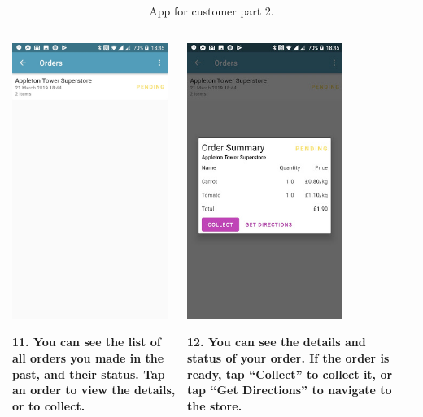 \documentclass[onecolumn]{IEEEtran}
\begin{document}
\begin{table}[H]
\begin{tabular}{ | m{5.5cm} | m{5.5cm} | m{5.5cm} | }
\begin{minipage}{.31\textwidth}
      \includegraphics[width=\linewidth, height=90mm]{eleven.jpg}
    \end{minipage}
    11. You can see the list of all orders you made in the past, and their status. Tap an order to view the details, or to collect.
    & 
    \begin{minipage}{.31\textwidth}
      \includegraphics[width=\linewidth, height=90mm]{twelve.jpg}
    \end{minipage}
    12. You can see the details and status of your order. If the order is ready, tap “Collect” to collect it, or tap “Get Directions” to navigate to the store.
    \\ \hline
  \end{tabular}
  \caption{App for customer part 2.}\label{tbl:myLboro}
\end{table}
\end{document}
